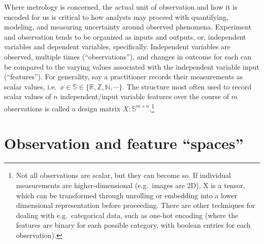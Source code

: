 \documentclass[%
	12pt,
		oneside,
		letterpaper
]{book}
\begin{document}
Where metrology is concerned, the actual unit of observation and how it
is encoded for us is critical to how analysts may proceed with
quantifying, modeling, and measuring uncertainty around observed
phenomena. Experiment and observation tends to be organized as inputs
and outputs, or, independent variables and dependent variables,
specifically. Independent variables are observed, multiple times
(``observations''), and changes in outcome for each can be compared to
the varying values associated with the independent variable input
(``features''). For generality, say a practitioner records their
measurements as scalar values,
i.e.~\(x\in\mathbb{S}\in\{\mathbb{R,Z,N},\cdots\}\). The structure most
often used to record scalar values of \(n\) independent/input variable
features over the course of \(m\) observations is called a design matrix
\(X:\mathbb{S}^{m\times n}\).\footnote{ Not all observations are scalar,
  but they can become so. If individual measurements are
  higher-dimensional (e.g.~images are 2D), X is a tensor, which can be
  transformed through unrolling or embedding into a lower dimensional
  representation before proceeding. There are other techniques for
  dealing with e.g.~categorical data, such as one-hot encoding (where
  the features are binary for each possible category, with boolean
  entries for each observation).}

\section{Observation and feature ``spaces''}\label{sec-matrix-notation}
\end{document}
